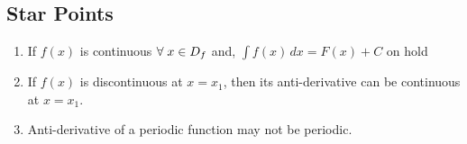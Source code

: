 \documentclass{article}
\begin{document}
\subsection*{Star Points}
\begin{enumerate}
    \item If $f(x)$ is continuous $\forall \hspace{1mm} x \in D_{f}$ and,
          \newline \newline $\displaystyle\int f(x) \, dx=F(x)+C$ on hold
    \item If $f(x)$ is discontinuous at $x=x_{1}$, then its anti-derivative can be continuous at $x=x_{1}$.
    \item Anti-derivative of a periodic function may not be periodic.
\end{enumerate}
\end{document}

